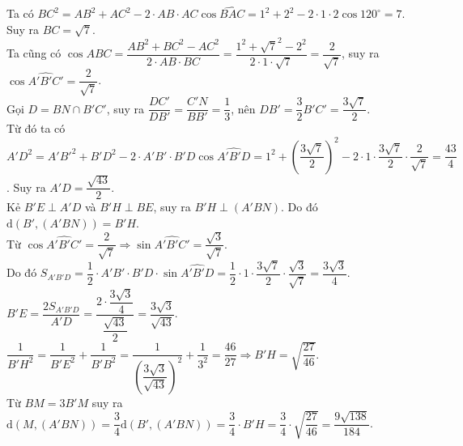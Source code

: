 \begin{ex}
{\begin{center}
		\end{center}
		Ta có $BC^2=AB^2+AC^2-2\cdot AB\cdot AC\cos \widehat{BAC}=1^2+2^2-2\cdot 1\cdot 2\cos 120^\circ =7$. Suy ra $BC=\sqrt{7}$.\\
		Ta cũng có $\cos \widehat{ABC}=\dfrac{AB^2+BC^2-AC^2}{2\cdot AB\cdot BC}=\dfrac{1^2+\sqrt{7}^2-2^2}{2\cdot 1\cdot \sqrt{7}}=\dfrac{2}{\sqrt{7}}$, suy ra $\cos \widehat{A'B'C'}=\dfrac{2}{\sqrt{7}}$.\\
		Gọi $D=BN\cap B'C'$, suy ra $\dfrac{DC'}{DB'}=\dfrac{C'N}{BB'}=\dfrac{1}{3}$, nên $DB'=\dfrac{3}{2}B'C'=\dfrac{3\sqrt{7}}{2}$.\\
		Từ đó ta có $A'D^2=A'B'^2+B'D^2-2\cdot A'B'\cdot B'D\cos \widehat{A'B'D}=1^2+\left(\dfrac{3\sqrt{7}}{2}\right)^2-2\cdot 1\cdot \dfrac{3\sqrt{7}}{2}\cdot\dfrac{2}{\sqrt{7}}=\dfrac{43}{4}$. Suy ra $A'D=\dfrac{\sqrt{43}}{2}$.\\
		Kẻ $B'E\perp A'D$ và $B'H\perp BE$, suy ra $B'H\perp (A'BN)$. 
		Do đó $\mathrm{d}\left(B',(A'BN)\right)=B'H$.\\
		Từ $\cos \widehat{A'B'C'}=\dfrac{2}{\sqrt{7}}\Rightarrow \sin \widehat{A'B'C'}=\dfrac{\sqrt{3}}{\sqrt{7}}$. \\
		Do đó
		$S_{A'B'D}=\dfrac{1}{2}\cdot A'B'\cdot B'D\cdot \sin \widehat{A'B'D}=\dfrac{1}{2}\cdot 1\cdot \dfrac{3\sqrt{7}}{2}\cdot \dfrac{\sqrt{3}}{\sqrt{7}}=\dfrac{3\sqrt{3}}{4}$.\\
		$B'E=\dfrac{2S_{A'B'D}}{A'D}=\dfrac{2\cdot\dfrac{3\sqrt{3}}{4} }{\dfrac{\sqrt{43}}{2}}=\dfrac{3\sqrt{3}}{\sqrt{43}}$.\\
		$\dfrac{1}{B'H^2}=\dfrac{1}{B'E^2}+\dfrac{1}{B'B^2}=\dfrac{1}{\left(\dfrac{3\sqrt{3}}{\sqrt{43}}\right)^2}+\dfrac{1}{3^2}=\dfrac{46}{27}\Rightarrow B'H=\sqrt{\dfrac{27}{46}}$.\\
		Từ $BM=3B'M$ suy ra $\mathrm{d}\left(M,(A'BN)\right)=\dfrac{3}{4}\mathrm{d}\left(B',(A'BN)\right)=\dfrac{3}{4}\cdot B'H=\dfrac{3}{4}\cdot \sqrt{\dfrac{27}{46}}=\dfrac{9\sqrt{138}}{184}$.
	}
\end{ex}%
